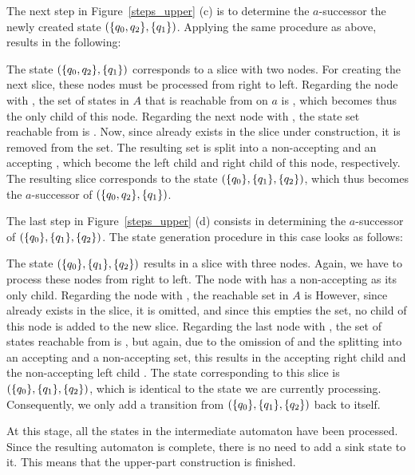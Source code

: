 The next step in Figure~\ref{steps_upper} (c) is to determine the $a$-successor the newly created state $(\{q_{0},q_{2}\}, \{q_{1}\})$. Applying the same procedure as above, results in the following:

\begin{center}
\SlicesTwo
\end{center}

The state $(\{q_{0},q_{2}\}, \{q_{1}\})$ corresponds to a slice with two nodes. For creating the next slice, these nodes must be processed from right to left. Regarding the node with , the set of states in $A$ that is reachable from  on $a$ is , which becomes thus the only child of this node. Regarding the next node with , the state set reachable from  is . Now, since  already exists in the slice under construction, it is removed from the set. The resulting set  is split into a non-accepting  and an accepting , which become the left child and right child of this node, respectively. The resulting slice corresponds to the state $(\{q_{0}\}, \{q_{1}\}, \{q_{2}\})$, which thus becomes the $a$-successor of $(\{q_{0},q_{2}\}, \{q_{1}\})$.

The last step in Figure~\ref{steps_upper} (d) consists in determining the $a$-successor of $(\{q_{0}\}, \{q_{1}\}, \{q_{2}\})$. The state generation procedure in this case looks as follows:

\begin{center}
\SlicesThree
\end{center}

The state $(\{q_{0}\}, \{q_{1}\}, \{q_{2}\})$ results in a slice with three nodes. Again, we have to process these nodes from right to left. The node with  has a non-accepting  as its only child. Regarding the node with , the reachable set in $A$ is  However, since  already exists in the slice, it is omitted, and since this empties the set, no child of this node is added to the new slice. Regarding the last node with , the set of states reachable from  is , but again, due to the omission of  and the splitting into an accepting and a non-accepting set, this results in the accepting right child  and the non-accepting left child . The state corresponding to this slice is $(\{q_{0}\}, \{q_{1}\}, \{q_{2}\})$, which is identical to the state we are currently processing. Consequently, we only add a transition from $(\{q_{0}\}, \{q_{1}\}, \{q_{2}\})$ back to itself.

At this stage, all the states in the intermediate automaton have been processed. Since the resulting automaton is complete, there is no need to add a sink state to it. This means that the upper-part construction is finished.

